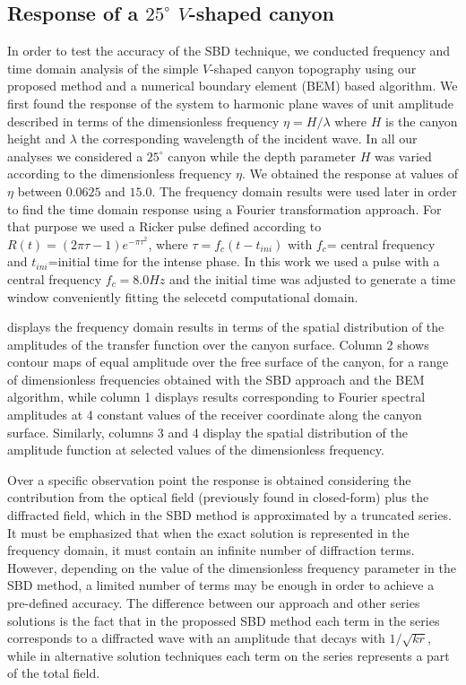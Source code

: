 \documentclass[11pt,letterpaper]{article}
\begin{document}
\subsection*{Response of a $25^\circ$ $V$-shaped canyon}

In order to test the accuracy of the SBD technique, we conducted frequency and time domain analysis of the simple $V$-shaped canyon topography using our proposed method and a numerical boundary element (BEM) based algorithm. We first found the response of the system to harmonic plane waves of unit amplitude described in terms of the dimensionless frequency $\eta=H/\lambda$ where $H$ is the canyon height and $\lambda$ the corresponding wavelength of the incident wave. In all our analyses we considered a $25^\circ$ canyon while the depth parameter $H$ was varied according to the dimensionless frequency $\eta$. We obtained the response at values of $\eta$ between $0.0625$ and $15.0$. The frequency domain results were used later in order to find the time domain response using a Fourier transformation approach. For that purpose we used a Ricker pulse defined according to $R(t) = (2\pi\tau-1)e^{-\pi\tau^2}$, where $\tau=f_c(t-t_{ini})$ with $f_c$= central frequency and $t_{ini}$=initial time for the intense phase. In this work we used a pulse with a central frequency $f_c=8.0Hz$ and the initial time was adjusted to generate a time window conveniently fitting the selecetd computational domain.

 displays the frequency domain results in terms of the spatial distribution of the amplitudes of the transfer function over the canyon surface. Column 2 shows contour maps of equal amplitude over the free surface of the canyon, for a range of dimensionless frequencies obtained with the SBD approach and the BEM algorithm, while column 1 displays results corresponding to Fourier spectral amplitudes at 4 constant values of the receiver coordinate along the canyon surface. Similarly, columns 3 and 4 display the spatial distribution of the amplitude function at selected values of the dimensionless frequency.

Over a specific observation point the response is obtained considering the contribution from the optical field (previously found in closed-form) plus the diffracted field, which in the SBD method is approximated by a truncated series. It must be emphasized that when the exact solution is represented in the frequency domain, it must contain an infinite number of diffraction terms. However, depending on the value of the dimensionless frequency parameter in the SBD method, a limited number of terms may be enough in order to achieve a pre-defined accuracy. The difference between our approach and other series solutions is the fact that in the propossed SBD method each term in the series corresponds to a diffracted wave with an amplitude that decays with  $1/\sqrt{k r}$, while in alternative solution techniques each term on the series represents a part of the total field.
\end{document}
